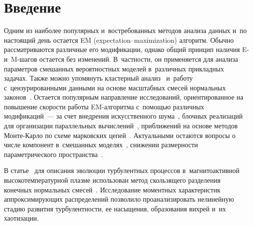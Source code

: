 
  




\thispagestyle{headings}

\begin{multicols}{2}

\label{st\stat}


\section{Введение}


Одним из наиболее популярных и~востребованных 
методов анализа данных и~по настоящий день остается
EM (expectation--maximization) 
алгоритм. Обычно рассматриваются различные его модификации, однако 
общий принцип наличия E- и~\mbox{M-ша}\-гов остается без изменений. В~частности, он 
при\-меняется для анализа па\-ра\-мет\-ров смешанных вероятностных моделей в~различных 
прикладных задачах. Также можно упомянуть кластерный 
анализ~\cite{Yang2012, Cai2019,Hassen2019} и~работу с~цензурированными данными 
на основе масштабных смесей нормальных законов~\cite{Zeller2019}. 
Остается популярным на\-прав\-ле\-ние исследований, ориентированное на повышение 
скорости работы EM-ал\-го\-рит\-ма с~помощью различных модификаций~--- за счет
 внедрения искусственного шума~\cite{Osoba2013}, блочных реализаций для 
 организации параллельных вычислений~\cite{Lee2018}, приближений на основе 
 методов Мон\-те-Кар\-ло по схеме марковских цепей~\cite{Wu2019}. Актуальными 
 остаются вопросы о числе компонент в~смешанных 
 моделях~\cite{Verbeek2003,Gorshenin2011,Liu2019}, снижении размерности 
 параметрического пространства~\cite{Yu2019}.

В статье~\cite{Gorshenin2019a} для описания эволюции турбулентных процессов 
в~маг\-ни\-то\-ак\-тив\-ной высокотемпературной плазме использован метод 
скользящего разделения конечных нормальных смесей~\cite{Korolev2011}. 
Исследование моментных характеристик аппроксимирующих распределений позволило 
проанализировать нелинейную стадию развития тур\-бу\-лент\-ности, ее насыщения, 
образования вихрей и~их хаотизации.


\end{multicols}
